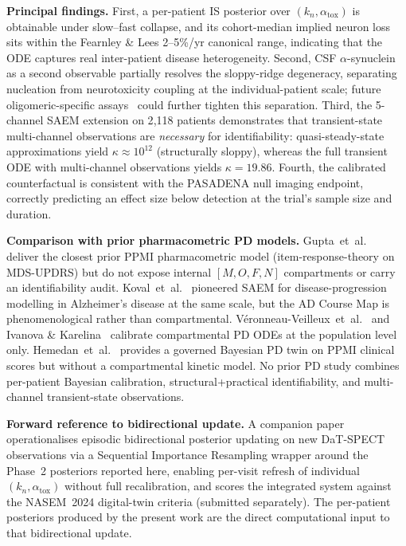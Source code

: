 \textbf{Principal findings.} First, a per-patient IS posterior over $(k_n, \alpha_\text{tox})$ is obtainable under slow--fast collapse, and its cohort-median implied neuron loss sits within the Fearnley \& Lees 2--5\%/yr canonical range, indicating that the ODE captures real inter-patient disease heterogeneity. Second, CSF $\alpha$-synuclein as a second observable partially resolves the sloppy-ridge degeneracy, separating nucleation from neurotoxicity coupling at the individual-patient scale; future oligomeric-specific assays~\cite{majbour2016} could further tighten this separation. Third, the 5-channel SAEM extension on 2{,}118 patients demonstrates that transient-state multi-channel observations are \emph{necessary} for identifiability: quasi-steady-state approximations yield $\kappa \approx 10^{12}$ (structurally sloppy), whereas the full transient ODE with multi-channel observations yields $\kappa = 19.86$. Fourth, the calibrated counterfactual is consistent with the PASADENA null imaging endpoint, correctly predicting an effect size below detection at the trial's sample size and duration.

\textbf{Comparison with prior pharmacometric PD models.} Gupta~et~al.~\cite{gupta2025} deliver the closest prior PPMI pharmacometric model (item-response-theory on MDS-UPDRS) but do not expose internal $[M,O,F,N]$ compartments or carry an identifiability audit. Koval~et~al.~\cite{koval2021admap} pioneered SAEM for disease-progression modelling in Alzheimer's disease at the same scale, but the AD Course Map is phenomenological rather than compartmental. V\'eronneau-Veilleux~et~al.~\cite{veronneau2020,veronneau2020chaos,veronneau2020integrative} and Ivanova \& Karelina~\cite{ivanova2024} calibrate compartmental PD ODEs at the population level only. Hemedan~et~al.~\cite{hemedan2026} provides a governed Bayesian PD twin on PPMI clinical scores but without a compartmental kinetic model. No prior PD study combines per-patient Bayesian calibration, structural+practical identifiability, and multi-channel transient-state observations.

\textbf{Forward reference to bidirectional update.} A companion paper operationalises episodic bidirectional posterior updating on new DaT-SPECT observations via a Sequential Importance Resampling wrapper around the Phase~2 posteriors reported here, enabling per-visit refresh of individual $(k_n, \alpha_\text{tox})$ without full recalibration, and scores the integrated system against the NASEM~2024 digital-twin criteria (submitted separately). The per-patient posteriors produced by the present work are the direct computational input to that bidirectional update.

